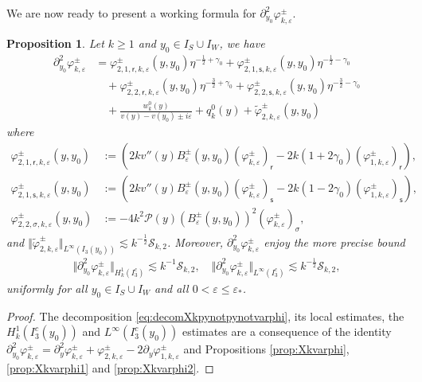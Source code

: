 \documentclass[11pt,reqno]{amsproc}
\newtheorem{proposition}{Proposition}[section]
\theoremstyle{definition}
\numberwithin{equation}{section}
\newcommand{\sr}{{\mathsf{r}}}
\newcommand{\s}{{\mathsf{s}}}
\newcommand{\cS}{{\mathcal S}}
\newcommand{\ep}{\varepsilon}
\renewcommand{\P}{{\mathcal{P}}}
\begin{document}
We are now ready to present a working formula for $\partial_{y_0}^2\varphi_{k,\ep}^\pm$.

\begin{proposition}\label{prop:Xkpynotpynotvarphi}
Let $k\geq 1$ and $y_0\in I_S\cup I_W$, we have
\begin{equation}\label{eq:decomXkpynotpynotvarphi}
\begin{split}
\partial_{y_0}^2\varphi_{k,\ep}^\pm &= \varphi_{2,1,\sr,k,\ep}^\pm(y,y_0) \eta^{-\frac12+\gamma_0} + \varphi_{2,1,\s,k,\ep}^\pm(y,y_0) \eta^{-\frac12-\gamma_0} \\
&\quad + \varphi_{2,2,\sr,k,\ep}^\pm(y,y_0) \eta^{-\frac32+\gamma_0} + \varphi_{2,2,\s,k,\ep}^\pm(y,y_0) \eta^{-\frac32-\gamma_0} \\ 
&\quad + \frac{w_k^0(y)}{v(y) - v(y_0) \pm i\ep} + q_k^0(y) + \widetilde\varphi_{2,k,\ep}^\pm(y,y_0) 
\end{split}
\end{equation}
where
\begin{align*}
\varphi_{2,1,\sr,k,\ep}^\pm(y,y_0) &:= \left( 2kv''(y)B_{\ep}^\pm(y,y_0)  \left( \varphi_{k,\ep}^\pm \right)_\sr - 2k(1+2\gamma_0) \left( \varphi_{1,k,\ep}^\pm \right)_\sr \right),  \\
\varphi_{2,1,\s,k,\ep}^\pm(y,y_0) &:=\left( 2kv''(y)B_{\ep}^\pm(y,y_0)  \left( \varphi_{k,\ep}^\pm \right)_\s - 2k(1-2\gamma_0) \left( \varphi_{1,k,\ep}^\pm \right)_\s \right), \\
\varphi_{2,2,\sigma,k,\ep}^\pm(y,y_0) &:= - 4k^2\P(y) (B_{\ep}^\pm(y,y_0))^2  \left( \varphi_{k,\ep}^\pm \right)_\sigma, 
\end{align*}
and $\Vert \widetilde{\varphi}_{2,k,\ep}^\pm \Vert_{L^\infty(I_3(y_0))} \lesssim k^{-\frac12}\cS_{k,2}$. Moreover, $\partial_{y_0}^2\varphi_{k,\ep}^\pm$ enjoy the more precise bound
\begin{align*}
\Vert \partial_{y_0}^2\varphi_{k,\ep}^\pm \Vert_{H_k^1(I_3^c)} \lesssim  k^{-1}\cS_{k,2}, \quad \Vert \partial_{y_0}^2\varphi_{k,\ep}^\pm \Vert_{L^\infty(I_3^c)} \lesssim  k^{-\frac12}\cS_{k,2},
\end{align*}
uniformly for all $y_0\in I_S\cup I_{W}$ and all $0 < \ep\leq \ep_*$.
\end{proposition}

\begin{proof}
The decomposition \eqref{eq:decomXkpynotpynotvarphi}, its local estimates, the ${H_k^1(I_3^c(y_0))}$ and $L^\infty(I_3^c(y_0))$ estimates are a consequence of the identity $\partial_{y_0}^2\varphi_{k,\ep}^\pm = \partial_y^2\varphi_{k,\ep}^\pm + \varphi_{2,k,\ep}^\pm -2\partial_y \varphi_{1,k,\ep}^\pm$ and Propositions \ref{prop:Xkvarphi}, \ref{prop:Xkvarphi1} and \ref{prop:Xkvarphi2}.
\end{proof}
\end{document}

